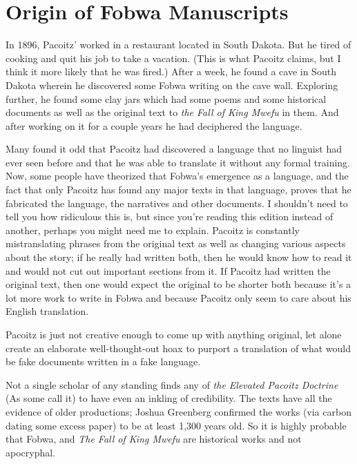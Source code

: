 \chapter{Origin of Fobwa Manuscripts}
In 1896, Pacoitz' worked in a restaurant located in South Dakota. But he tired of cooking and quit his job to take a vacation. (This is what Pacoitz claims, but I think it more likely that he was fired.) After a week, he found a cave in South Dakota wherein he discovered some Fobwa writing on the cave wall. Exploring further, he found some clay jars which had some poems and some historical documents as well as the original text to \emph{the Fall of King Mwefu} in them. And after working on it for a couple years he had deciphered the language.

Many found it odd that Pacoitz had discovered a language that no linguist had ever seen before and that he was able to translate it without any formal training. Now, some people have theorized that Fobwa's emergence as a language, and the fact that only Pacoitz has found any major texts in that language, proves that he fabricated the language, the narratives and other documents. I shouldn't need to tell you how ridiculous this is, but since you're reading this edition instead of another, perhaps you might need me to explain. Pacoitz is constantly mistranslating phrases from the original text as well as changing various aspects about the story; if he really had written both, then he would know how to read it and would not cut out important sections from it. If Pacoitz had written the original text, then one would expect the original to be shorter both because it's a lot more work to write in Fobwa and because Pacoitz only seem to care about his English translation.

Pacoitz is just not creative enough to come up with anything original, let alone create an elaborate well-thought-out hoax to purport a translation of what would be fake documents written in a fake language.

Not a single scholar of any standing finds any of \emph{the Elevated Pacoitz Doctrine} (As some call it) to have even an inkling of credibility. The texts have all the evidence of older productions; Joshua Greenberg confirmed the works (via carbon dating some excess paper) to be at least 1,300 years old. So it is highly probable that Fobwa, and \emph{The Fall of King Mwefu} are historical works and not apocryphal.


